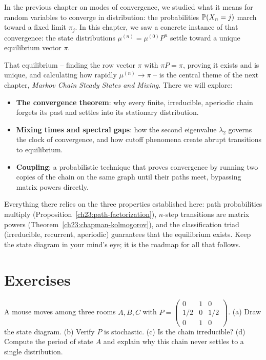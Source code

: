 \begin{connectionbox}
In the previous chapter on modes of convergence, we studied what it means for random variables
to converge in distribution: the probabilities $\P(X_n = j)$ march toward a fixed limit $\pi_j$.
In this chapter, we saw a concrete instance of that convergence: the state distributions
$\mu^{(n)} = \mu^{(0)} P^n$ settle toward a unique equilibrium vector $\pi$.

That equilibrium -- finding the row vector $\pi$ with $\pi P = \pi$, proving it exists and is
unique, and calculating how rapidly $\mu^{(n)} \to \pi$ -- is the central theme of the next
chapter, \emph{Markov Chain Steady States and Mixing}. There we will explore:
\begin{itemize}
  \item \textbf{The convergence theorem}: why every finite, irreducible, aperiodic chain
    forgets its past and settles into its stationary distribution.
  \item \textbf{Mixing times and spectral gaps}: how the second eigenvalue $\lambda_2$ governs the
    clock of convergence, and how cutoff phenomena create abrupt transitions to equilibrium.
  \item \textbf{Coupling}: a probabilistic technique that proves convergence by running
    two copies of the chain on the same graph until their paths meet, bypassing matrix powers directly.
\end{itemize}
Everything there relies on the three properties established here: path probabilities multiply
(Proposition~\ref{ch23:path-factorization}), $n$-step transitions are matrix powers
(Theorem~\ref{ch23:chapman-kolmogorov}), and the classification triad (irreducible, recurrent,
aperiodic) guarantees that the equilibrium exists. Keep the state diagram in your mind's eye;
it is the roadmap for all that follows.
\end{connectionbox}

\section{Exercises}
\label{ch23:exercises}

\begin{exercise}
\label{ch23:ex-read-matrix}
A mouse moves among three rooms $A, B, C$ with
$P = \left(\begin{smallmatrix} 0 & 1 & 0 \\ 1/2 & 0 & 1/2 \\ 0 & 1 & 0 \end{smallmatrix}\right)$.
(a) Draw the state diagram. (b) Verify $P$ is stochastic. (c) Is the chain irreducible?
(d) Compute the period of state $A$ and explain why this chain never settles to a single
distribution.
\end{exercise}

